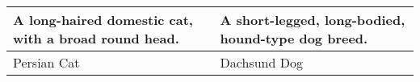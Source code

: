 \documentclass[12pt]{article}
\begin{document}
\begin{tabular}{|p{1.5in}|p{1.5in}|}\hline
A long-haired domestic cat, with a broad round head. &
A short-legged, long-bodied, hound-type dog breed.\\\hline
Persian Cat & Dachsund Dog\\\hline
\end{tabular}
\end{document}
